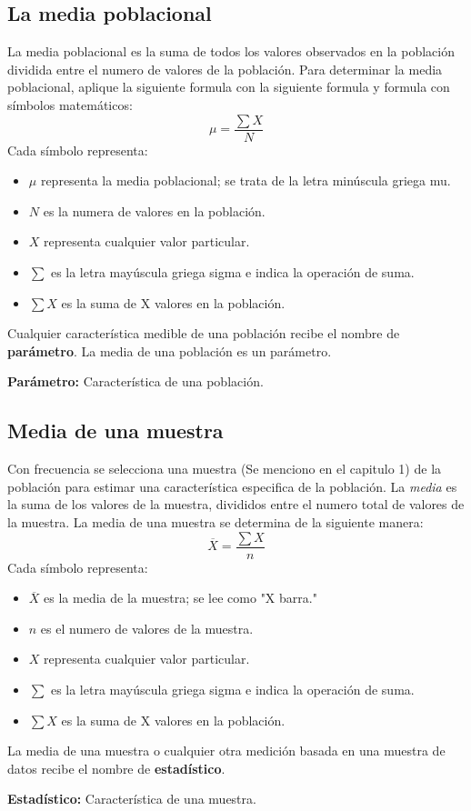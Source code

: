 \documentclass[]{article}
\begin{document}
\subsection{La media poblacional}
La media poblacional es la suma de todos los valores observados en la población dividida entre el numero de valores de la población. Para determinar la media poblacional, aplique la siguiente formula con la siguiente formula y formula con símbolos matemáticos:
\[ \mu=\frac{\sum X}{N} \] 
Cada símbolo representa:
\begin{itemize}
	\item $\mu$ representa la media poblacional; se trata de la letra minúscula griega mu.
	\item $N$ es la numera de valores en la población.
	\item $X$ representa cualquier valor particular.
	\item $\sum$ es la letra mayúscula griega sigma e indica la operación de suma.
	\item $\sum X$ es la suma de X valores en la población.
\end{itemize}
Cualquier característica medible de una población recibe el nombre de \textbf{parámetro}. La media de una población es un parámetro.
\begin{center}
	\textbf{Parámetro: }Característica de una población.
\end{center}

\subsection{Media de una muestra}
Con frecuencia se selecciona una muestra (Se menciono en el capitulo 1) de la población para estimar una característica especifica de la población. La \textit{media} es la suma de los valores de la muestra, divididos entre el numero total de valores de la muestra. La media de una muestra se determina de  la siguiente manera:
\[\overline{X} = \frac{\sum X}{n} \]
Cada símbolo representa:
\begin{itemize}
	\item $\overline{X}$ es la media de la muestra; se lee como "X barra."
	\item $n$ es el numero de valores de la muestra.
	\item $X$ representa cualquier valor particular.
	\item $\sum$ es la letra mayúscula griega sigma e indica la operación de suma.
	\item $\sum X$ es la suma de X valores en la población.
\end{itemize}
La media de una muestra o cualquier otra medición basada en una muestra de datos recibe el nombre de \textbf{estadístico}.
\begin{center}
	\textbf{Estadístico: }Característica de una muestra.
\end{center}
\end{document}
